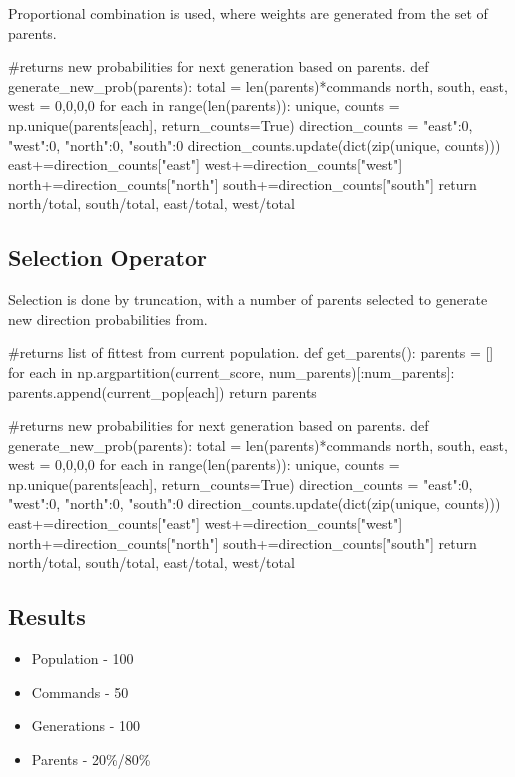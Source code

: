 \documentclass{article}
\begin{document}
Proportional combination is used, where weights are generated from the set of parents. 

\begin{python}
#returns new probabilities for next generation based on parents.
def generate_new_prob(parents):
	total = len(parents)*commands
	north, south, east, west = 0,0,0,0
	for each in range(len(parents)):
		unique, counts = np.unique(parents[each], return_counts=True)
		direction_counts = {"east":0, "west":0, "north":0, "south":0}
		direction_counts.update(dict(zip(unique, counts)))
		east+=direction_counts["east"]
		west+=direction_counts["west"]
		north+=direction_counts["north"]
		south+=direction_counts["south"]
	return north/total, south/total, east/total, west/total
\end{python}

\subsection{Selection Operator}

Selection is done by truncation, with a number of parents selected to generate new direction probabilities from. 

\begin{python}
#returns list of fittest from current population.
def get_parents():
	parents = []
	for each in np.argpartition(current_score, num_parents)[:num_parents]:
		parents.append(current_pop[each])
	return parents
	

#returns new probabilities for next generation based on parents.
def generate_new_prob(parents):
	total = len(parents)*commands
	north, south, east, west = 0,0,0,0
	for each in range(len(parents)):
		unique, counts = np.unique(parents[each], return_counts=True)
		direction_counts = {"east":0, "west":0, "north":0, "south":0}
		direction_counts.update(dict(zip(unique, counts)))
		east+=direction_counts["east"]
		west+=direction_counts["west"]
		north+=direction_counts["north"]
		south+=direction_counts["south"]
	return north/total, south/total, east/total, west/total
\end{python}
\newpage
\subsection{Results}

\begin{itemize}
  \item Population - 100
  \item Commands - 50
  \item Generations - 100
  \item Parents - 20\%/80\%
\end{itemize}
\end{document}
